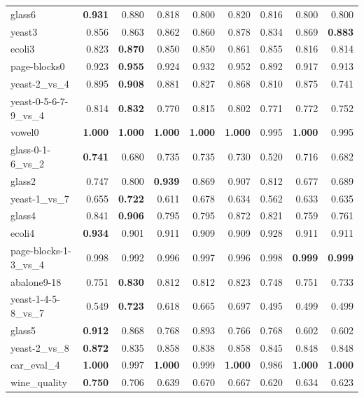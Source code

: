 {\begin{table}[htbp]
{\begin{tabular}{lrrrrrrrr}
	       	glass6 & \textbf{0.931} & 0.880 & 0.818 & 0.800 & 0.820 & 0.816 & 0.800 & 0.800 \\
	       	yeast3 & 0.856 & 0.863 & 0.862 & 0.860 & 0.878 & 0.834 & 0.869 & \textbf{0.883} \\
	       	ecoli3 & 0.823 & \textbf{0.870} & 0.850 & 0.850 & 0.861 & 0.855 & 0.816 & 0.814 \\
	       	page-blocks0 & 0.923 & \textbf{0.955} & 0.924 & 0.932 & 0.952 & 0.892 & 0.917 & 0.913 \\
	       	yeast-2\_vs\_4 & 0.895 & \textbf{0.908} & 0.881 & 0.827 & 0.868 & 0.810 & 0.875 & 0.741 \\
	       	yeast-0-5-6-7-9\_vs\_4 & 0.814 & \textbf{0.832} & 0.770 & 0.815 & 0.802 & 0.771 & 0.772 & 0.752 \\
	       	vowel0 & \textbf{1.000} & \textbf{1.000} & \textbf{1.000} & \textbf{1.000} & \textbf{1.000} & 0.995 & \textbf{1.000} & 0.995 \\
	       	glass-0-1-6\_vs\_2 & \textbf{0.741} & 0.680 & 0.735 & 0.735 & 0.730 & 0.520 & 0.716 & 0.682 \\
	       	glass2 & 0.747 & 0.800 & \textbf{0.939} & 0.869 & 0.907 & 0.812 & 0.677 & 0.689 \\
	       	yeast-1\_vs\_7 & 0.655 & \textbf{0.722} & 0.611 & 0.678 & 0.634 & 0.562 & 0.633 & 0.635 \\
	       	glass4 & 0.841 & \textbf{0.906} & 0.795 & 0.795 & 0.872 & 0.821 & 0.759 & 0.761 \\
	       	ecoli4 & \textbf{0.934} & 0.901 & 0.911 & 0.909 & 0.909 & 0.928 & 0.911 & 0.911 \\
	       	page-blocks-1-3\_vs\_4 & 0.998 & 0.992 & 0.996 & 0.997 & 0.996 & 0.998 & \textbf{0.999} & \textbf{0.999} \\
	       	abalone9-18 & 0.751 & \textbf{0.830} & 0.812 & 0.812 & 0.823 & 0.748 & 0.751 & 0.733 \\
	       	yeast-1-4-5-8\_vs\_7 & 0.549 & \textbf{0.723} & 0.618 & 0.665 & 0.697 & 0.495 & 0.499 & 0.499 \\
	       	glass5 & \textbf{0.912} & 0.868 & 0.768 & 0.893 & 0.766 & 0.768 & 0.602 & 0.602 \\
	       	yeast-2\_vs\_8 & \textbf{0.872} & 0.835 & 0.858 & 0.838 & 0.858 & 0.845 & 0.848 & 0.848 \\
	       	car\_eval\_4 & \textbf{1.000} & 0.997 & \textbf{1.000} & 0.999 & \textbf{1.000} & 0.986 & \textbf{1.000} & \textbf{1.000} \\
	       	wine\_quality & \textbf{0.750} & 0.706 & 0.639 & 0.670 & 0.667 & 0.620 & 0.634 & 0.623 \\

\end{tabular}}
\end{table}}
